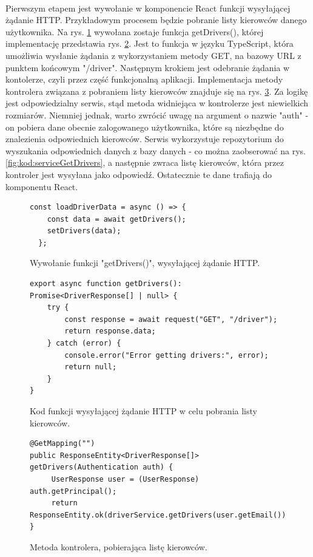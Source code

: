 \paragraph{}
Pierwszym etapem jest wywołanie w komponencie React funkcji wysyłającej żądanie HTTP. Przykładowym procesem będzie pobranie listy kierowców danego użytkownika. Na rys. \ref{fig:kod:startRequest} wywołana zostaje funkcja getDrivers(), której implementację przedstawia rys. \ref{fig:kod:getDrivers}. Jest to funkcja w języku TypeScript, która umożliwia wysłanie żądania z wykorzystaniem metody GET, na bazowy URL z punktem końcowym "/driver". Następnym krokiem jest odebranie żądania w kontolerze, czyli przez część funkcjonalną aplikacji. Implementacja metody kontrolera związana z pobraniem listy kierowców znajduje się na rys. \ref{fig:kod:controlerGetDrivers}. Za logikę jest odpowiedzialny serwis, stąd metoda widniejąca w kontrolerze jest niewielkich rozmiarów. Niemniej jednak, warto zwrócić uwagę na argument o nazwie "auth" - on pobiera dane obecnie zalogowanego użytkownika, które są niezbędne do znalezienia odpowiednich kierowców. Serwis wykorzystuje repozytorium do wyszukania odpowiednich danych z bazy danych - co można zaobserować na rys. \ref{fig:kod:serviceGetDrivers}, a następnie zwraca listę kierowców, która przez kontroler jest wysyłana jako odpowiedź. Ostatecznie te dane trafiają do komponentu React.


\begin{figure}
\centering
\begin{lstlisting}
const loadDriverData = async () => {
    const data = await getDrivers();
    setDrivers(data);
  };
\end{lstlisting}
\caption{Wywołanie funkcji "getDrivers()", wysyłającej żądanie HTTP.}
\label{fig:kod:startRequest}
\end{figure}

\begin{figure}
\centering
\begin{lstlisting}
export async function getDrivers(): Promise<DriverResponse[] | null> {
    try {
        const response = await request("GET", "/driver");
        return response.data;
    } catch (error) {
        console.error("Error getting drivers:", error);
        return null;
    }
}
\end{lstlisting}
\caption{Kod funkcji wysyłającej żądanie HTTP w celu pobrania listy kierowców.}
\label{fig:kod:getDrivers}
\end{figure}

\begin{figure}
\centering
\begin{lstlisting}
@GetMapping("")
public ResponseEntity<DriverResponse[]> getDrivers(Authentication auth) {
     UserResponse user = (UserResponse) auth.getPrincipal();
     return ResponseEntity.ok(driverService.getDrivers(user.getEmail()));
}
\end{lstlisting}
\caption{Metoda kontrolera, pobierająca listę kierowców.}
\label{fig:kod:controlerGetDrivers}
\end{figure}

